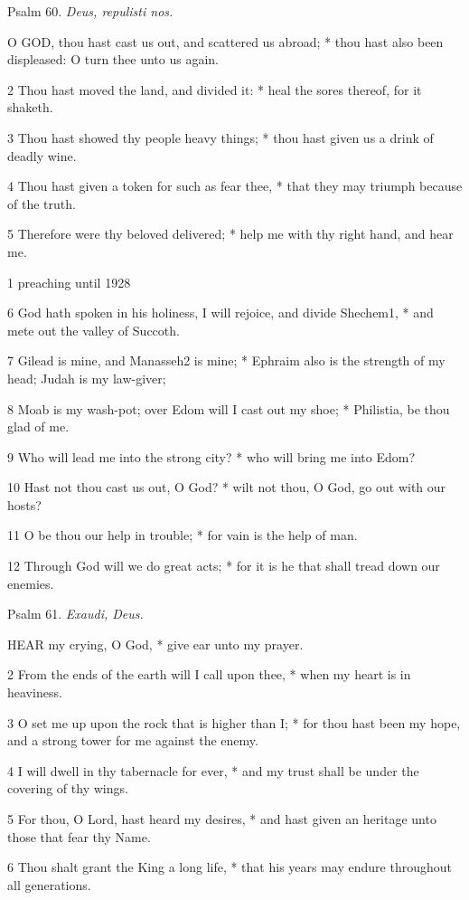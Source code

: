 Psalm
60. \emph{Deus, repulisti nos.}

O
GOD, thou hast cast us out, and scattered us abroad; * thou hast also
been displeased: O turn thee unto us again.

2 Thou hast moved the land, and divided it: * heal
the sores thereof, for it shaketh.

3 Thou hast showed thy people heavy things; * thou
hast given us a drink of deadly wine.

4 Thou hast given a token for such as fear thee, *
that they may triumph because of the truth.

5 Therefore were thy beloved delivered; * help me with
thy right hand, and hear me.

1 preaching
until 1928

6 God hath spoken in his holiness, I will rejoice, and divide Shechem1,
* and mete out the valley of Succoth.

7 Gilead is mine, and Manasseh2 is mine;
* Ephraim also is the strength of my head; Judah is my law-giver;

8 Moab is my wash-pot; over Edom will I cast out my
shoe; * Philistia, be thou glad of me.

9 Who will lead me into the strong city? * who will
bring me into Edom?

10 Hast not thou cast us out, O God? * wilt not thou,
O God, go out with our hosts?

11 O be thou our help in trouble; * for vain is the
help of man.

12 Through God will we do great acts; * for it is he
that shall tread down our enemies.

Psalm
61. \emph{Exaudi, Deus.}

HEAR
my crying, O God, * give ear unto my prayer.

2 From the ends of the earth will I call upon thee,
* when my heart is in heaviness.

3 O set me up upon the rock that is higher than I;
* for thou hast been my hope, and a strong tower for me against the enemy.

4 I will dwell in thy tabernacle for ever, * and my
trust shall be under the covering of thy wings.

5 For thou, O Lord, hast heard my desires, * and hast
given an heritage unto those that fear thy Name.

6 Thou shalt grant the King a long life, * that his
years may endure throughout all generations.

